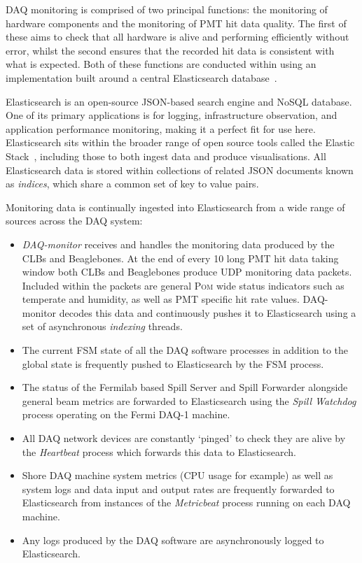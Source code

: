 \chipsfive DAQ monitoring is comprised of two principal functions: the monitoring of hardware
components and the monitoring of PMT hit data quality. The first of these aims to check that all
hardware is alive and performing efficiently without error, whilst the second ensures that the
recorded hit data is consistent with what is expected. Both of these functions are conducted
within \chipsfive using an implementation built around a central Elasticsearch
database~\cite{elasticsearch2020}.

Elasticsearch is an open-source JSON-based search engine and NoSQL database. One of its primary
applications is for logging, infrastructure observation, and application performance monitoring,
making it a perfect fit for use here. Elasticsearch sits within the broader range of open source
tools called the Elastic Stack~\cite{elasticstack2020}, including those to both ingest data and
produce visualisations. All Elasticsearch data is stored within collections of related JSON
documents known as \emph{indices}, which share a common set of key to value pairs.

Monitoring data is continually ingested into Elasticsearch from a wide range of sources across the
\chipsfive DAQ system:
\begin{itemize}
    \item \emph{DAQ-monitor} receives and handles the monitoring data produced by the CLBs and
    Beaglebones. At the end of every \SI{10}{} long PMT hit data taking window both CLBs
    and Beaglebones produce UDP monitoring data packets. Included within the packets are general
    \textsc{Pom} wide status indicators such as temperate and humidity, as well as PMT specific
    hit rate values. DAQ-monitor decodes this data and continuously pushes it to Elasticsearch
    using a set of asynchronous \emph{indexing} threads.
    \item The current FSM state of all the DAQ software processes in addition to the global state
    is frequently pushed to Elasticsearch by the FSM process.
    \item The status of the Fermilab based Spill Server and Spill Forwarder alongside general
    \numi beam metrics are forwarded to Elasticsearch using the \emph{Spill Watchdog} process
    operating on the Fermi DAQ-1 machine.
    \item All DAQ network devices are constantly `pinged' to check they are alive by the
    \emph{Heartbeat} process which forwards this data to Elasticsearch.
    \item Shore DAQ machine system metrics (CPU usage for example) as well as system logs and data
    input and output rates are frequently forwarded to Elasticsearch from instances of the
    \emph{Metricbeat} process running on each DAQ machine.
    \item Any logs produced by the DAQ software are asynchronously logged to Elasticsearch.
\end{itemize}

